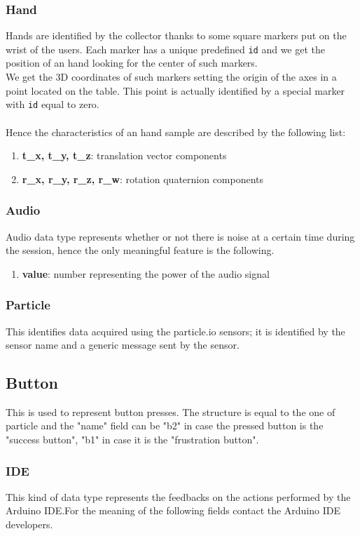 \documentclass[a4paper,notitlepage,onecolumn]{hitec}  %
\begin{document}
\subsubsection{Hand}
Hands are identified by the collector thanks to some square markers put on the wrist of the users. Each marker has a unique predefined {\tt id} and we get the position of an hand looking for the center of such markers. \\
We get the 3D coordinates of such markers setting the origin of the axes in a point located on the table. This point is actually identified by a special marker with {\tt id} equal to zero.\\  
\\Hence the characteristics of an hand sample are described by the following list:
\begin{enumerate}
\item\textbf{t\_x, t\_y, t\_z}: translation vector components
\item\textbf{r\_x, r\_y, r\_z, r\_w}: rotation quaternion components
\end{enumerate}

\subsubsection{Audio}
Audio data type represents whether or not there is noise at a certain time during the session, hence the only meaningful feature is the following.
\begin{enumerate}
\item\textbf{value}: number representing the power of the audio signal
\end{enumerate}

\subsubsection{Particle}
This identifies data acquired using the particle.io sensors; it is identified by the sensor name and a generic message sent by the sensor.

\subsection{Button}
This is used to represent button presses. The structure is equal to the one of particle and the "name" field can be "b2" in case the pressed button is the "success button", "b1" in case it is the "frustration button".

\subsubsection{IDE}
This kind of data type represents the feedbacks on the actions performed by the Arduino \ac{IDE}.For the meaning of the following fields contact the Arduino IDE developers.
\end{document}
